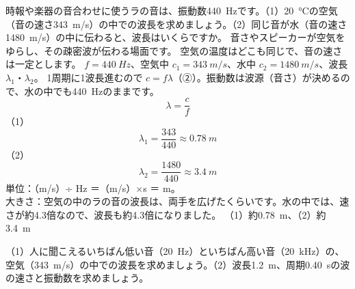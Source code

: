 \label{ph:波-5:ex2}
\begin{phreidai}[ラの音の波長]
時報や楽器の音合わせに使うラの音は、振動数\qty{440}{Hz}です。（1）\qty{20}{\celsius}の空気（音の速さ\qty{343}{m/s}）の中での波長を求めましょう。（2）同じ音が水（音の速さ\qty{1480}{m/s}）の中に伝わると、波長はいくらですか。
\phbamen
音さやスピーカーが空気をゆらし、その疎密波が伝わる場面です。
\phmushi
空気の温度はどこも同じで、音の速さは一定とします。
\phzu
$f=\qty{440}{Hz}$、空気中 $c_1=\qty{343}{m/s}$、水中 $c_2=\qty{1480}{m/s}$、波長 $\lambda_1$・$\lambda_2$。
\phriyu
1周期に1波長進むので $c=f\lambda$（②）。振動数は波源（音さ）が決めるので、水の中でも\qty{440}{Hz}のままです。
\phtateru
\[\lambda=\frac{c}{f}\]
\phtoku
（1）\[\lambda_1=\frac{343}{440}\approx\qty{0.78}{m}\]
（2）\[\lambda_2=\frac{1480}{440}\approx\qty{3.4}{m}\]
\phtashikame
単位：（m/s）÷ Hz ＝（m/s）×s ＝ m。\\
大きさ：空気の中のラの音の波長は、両手を広げたくらいです。水の中では、速さが約4.3倍なので、波長も約4.3倍になりました。
\kotae （1）約\qty{0.78}{m}、（2）約\qty{3.4}{m}
\end{phreidai}
\begin{jibun}
（1）人に聞こえるいちばん低い音（\qty{20}{Hz}）といちばん高い音（\qty{20}{kHz}）の、空気（\qty{343}{m/s}）の中での波長を求めましょう。（2）波長\qty{1.2}{m}、周期\qty{0.40}{s}の波の速さと振動数を求めましょう。
\end{jibun}

